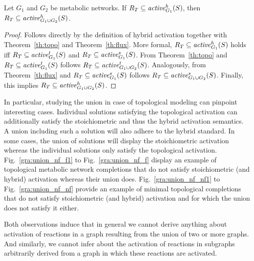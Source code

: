 \begin{theorem}\label{th:hybr}
Let $G_1$ and $G_2$ be metabolic networks.
If $R_T\subseteq\mathit{active}^{h}_{G_1}(S)$, then $R_T\subseteq\mathit{active}^{h}_{G_1\cup G_2}(S)$.
\end{theorem}

\begin{proof}
Follows directly by the definition of hybrid activation together with Theorem~\ref{th:topo} and Theorem~\ref{th:flux}.
More formal,
$R_T\subseteq\mathit{active}^{h}_{G_1}(S)$
holds iff
$R_T\subseteq\mathit{active}^{t}_{G_1}(S)$ and $R_T\subseteq\mathit{active}^{s}_{G_1}(S)$.
From Theorem~\ref{th:topo} and $R_T\subseteq\mathit{active}^{t}_{G_1}(S)$ follows
$R_T\subseteq\mathit{active}^{t}_{G_1\cup G_2}(S)$.
Analogously, from Theorem~\ref{th:flux} and $R_T\subseteq\mathit{active}^{s}_{G_1}(S)$ follows
$R_T\subseteq\mathit{active}^{s}_{G_1\cup G_2}(S)$.
Finally, this implies
$R_T\subseteq\mathit{active}^{h}_{G_1\cup G_2}(S)$.
\end{proof}



In particular, studying the union in case of topological modeling can pinpoint interesting cases.
Individual solutions satisfying the topological activation can additionally satisfy the stoichiometric and thus the hybrid activation semantics.
A union including such a solution will also adhere to the hybrid standard.
In some cases, the union of solutions will display the stoichiometric activation whereas the individual solutions only satisfy the topological activation.
Fig.~\ref{gra:union_nf_f1} to Fig.~\ref{gra:union_nf_f} display an example of topological metabolic network completions that do not satisfy stoichiometric (and hybrid) activation whereas their union does.
Fig.~\ref{gra:union_nf_nf1} to Fig.~\ref{gra:union_nf_nf} provide an example of minimal topological completions that do not satisfy stoichiometric (and hybrid) activation and for which the union does not satisfy it either.
%


Both observations induce that in general we cannot derive anything about activation of reactions in a graph resulting from the union of two or more graphs.
And similarly, we cannot infer about the activation of reactions in subgraphs arbitrarily derived from a graph in which these reactions are activated.


